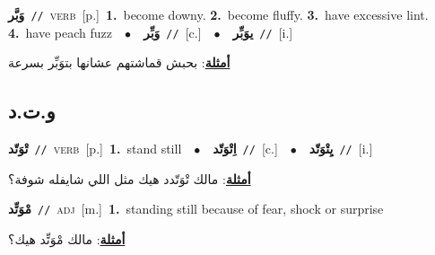 \documentclass[10pt,a4paper,twoside]{article} %
\begin{document}
\begin{multicols}{2}
{\setlength\topsep{0pt}\textbf{\foreignlanguage{arabic}{وَبَّر}}\ {\color{gray}\texttt{//}\color{black}}\ \textsc{verb}\ [p.]\ \textbf{1.}~become downy.  \textbf{2.}~become fluffy.  \textbf{3.}~have excessive lint.  \textbf{4.}~have peach fuzz\ \ $\bullet$\ \ \setlength\topsep{0pt}\textbf{\foreignlanguage{arabic}{وَبِّر}}\ {\color{gray}\texttt{//}\color{black}}\ [c.]\ \ $\bullet$\ \ \setlength\topsep{0pt}\textbf{\foreignlanguage{arabic}{يوَبِّر}}\ {\color{gray}\texttt{//}\color{black}}\ [i.]\  \begin{flushright}\color{gray}\foreignlanguage{arabic}{\textbf{\underline{\foreignlanguage{arabic}{أمثلة}}}: بحبش قماشتهم عشانها بتوَبِّر بسرعة}\end{flushright}\color{black}} \vspace{2mm}

\vspace{-3mm}
\subsection*{\color{blue}\foreignlanguage{arabic}{و.ت.د}\color{blue}{}} 

{\setlength\topsep{0pt}\textbf{\foreignlanguage{arabic}{تْوَتّد}}\ {\color{gray}\texttt{//}\color{black}}\ \textsc{verb}\ [p.]\ \textbf{1.}~stand still\ \ $\bullet$\ \ \setlength\topsep{0pt}\textbf{\foreignlanguage{arabic}{اِتْوَتّد}}\ {\color{gray}\texttt{//}\color{black}}\ [c.]\ \ $\bullet$\ \ \setlength\topsep{0pt}\textbf{\foreignlanguage{arabic}{يِتْوَتّد}}\ {\color{gray}\texttt{//}\color{black}}\ [i.]\  \begin{flushright}\color{gray}\foreignlanguage{arabic}{\textbf{\underline{\foreignlanguage{arabic}{أمثلة}}}: مالك تْوَتّدد هيك مثل اللي شايفله شوفة؟}\end{flushright}\color{black}} \vspace{2mm}

{\setlength\topsep{0pt}\textbf{\foreignlanguage{arabic}{مْوَتِّد}}\ {\color{gray}\texttt{//}\color{black}}\ \textsc{adj}\ [m.]\ \textbf{1.}~standing still because of fear, shock or surprise\  \begin{flushright}\color{gray}\foreignlanguage{arabic}{\textbf{\underline{\foreignlanguage{arabic}{أمثلة}}}: مالك مْوَتِّد هيك؟}\end{flushright}\color{black}} \vspace{2mm}


\end{multicols}
\end{document}
